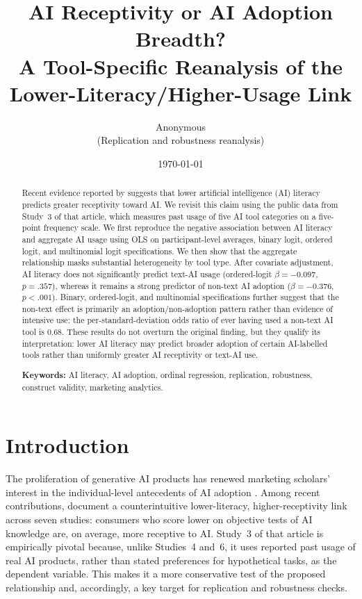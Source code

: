 \documentclass[11pt]{article}
\title{\vspace{-2em}AI Receptivity or AI Adoption Breadth?\\
A Tool-Specific Reanalysis of the\\ Lower-Literacy/Higher-Usage Link}
\author{Anonymous \\ \small (Replication and robustness reanalysis)}
\date{\today}
\begin{document}
\maketitle

\begin{abstract}
\noindent
Recent evidence reported by \citet{tully2025lower} suggests that lower artificial
intelligence (AI) literacy predicts greater receptivity toward AI. We revisit this
claim using the public data from Study~3 of that article, which measures past
usage of five AI tool categories on a five-point frequency scale. We first
reproduce the negative association between AI literacy and aggregate AI usage
using OLS on participant-level averages, binary logit, ordered logit, and
multinomial logit specifications. We then show that the aggregate relationship
masks substantial heterogeneity by tool type. After covariate adjustment, AI
literacy does not significantly predict text-AI usage (ordered-logit
$\beta = -0.097$, $p = .357$), whereas it remains a strong predictor of non-text
AI adoption ($\beta = -0.376$, $p < .001$). Binary, ordered-logit, and
multinomial specifications further suggest that the non-text effect is
primarily an adoption/non-adoption pattern rather than evidence of intensive
use: the per-standard-deviation odds ratio of ever having used a non-text
AI tool is $0.68$. These results do not overturn the original finding, but they
qualify its interpretation: lower AI literacy may predict broader adoption of
certain AI-labelled tools rather than uniformly greater AI receptivity or
text-AI use.

\medskip
\noindent\textbf{Keywords:} AI literacy, AI adoption, ordinal regression,
replication, robustness, construct validity, marketing analytics.
\end{abstract}

\section{Introduction}

The proliferation of generative AI products has renewed marketing scholars'
interest in the individual-level antecedents of AI adoption
\citep{puntoni2021consumers,hermann2024aiconsumer}. Among recent contributions,
\citet{tully2025lower} document a counterintuitive lower-literacy, higher-receptivity
link across seven studies: consumers who score lower on objective tests of AI knowledge are, on average, more receptive
to AI. Study~3 of that article is empirically pivotal because, unlike Studies~4
and~6, it uses reported past usage of real AI products, rather than stated
preferences for hypothetical tasks, as the dependent variable. This makes it a
more conservative test of the proposed relationship and, accordingly, a key
target for replication and robustness checks.
\end{document}

